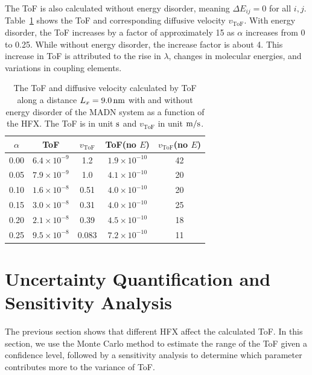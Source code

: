 \documentclass[%
 reprint,
superscriptaddress,
 amsmath,amssymb,
 aps,
prb,
floatfix
]{revtex4-2}
\begin{document}
The ToF is also calculated without energy disorder, meaning $\Delta E_{ij}=0$ for all $i,j$.
Table~\ref{tab:ToF_MADN_HFX} shows the ToF and corresponding diffusive velocity $v_\text{ToF}$.
With energy disorder, the ToF increases by a factor of approximately 15 as $\alpha$ increases from 0 to 0.25.  
While without energy disorder, the increase factor is about 4. This increase in ToF is attributed to the rise in $\lambda$, changes in molecular energies, and variations in coupling elements.

\begin{table}[tbp]
\caption{The ToF and diffusive velocity calculated by ToF along a distance $L_x = \unit[9.0]{nm}$ with and without energy disorder of the MADN system as a function of the HFX. The ToF is in unit $\unit[]{s}$ and $v_\text{ToF}$ in unit $\unit[]{m/s}$.}
\begin{ruledtabular}
  \begin{tabular}{c c c c c}
        $\alpha$ & ToF& $v_\text{ToF}$ & ToF(no $E$)& $v_\text{ToF}$(no $E$) \\
    \hline
        0.00 &  $6.4 \times 10^{-9}$ & 1.2 & $1.9 \times 10^{-10}$ & 42 \\
        0.05 & $ 7.9 \times 10^{-9}$ & 1.0 & $4.1 \times 10^{-10}$ & 20 \\
        0.10 & $ 1.6 \times 10^{-8}$ & 0.51 & $4.0 \times 10^{-10} $ & 20 \\
        0.15 & $ 3.0 \times 10^{-8}$ & 0.31 & $4.0 \times 10^{-10} $ & 25 \\
        0.20 & $ 2.1 \times 10^{-8}$ & 0.39 & $4.5 \times 10^{-10}$ & 18 \\
        0.25 & $ 9.5 \times 10^{-8}$ & 0.083 & $7.2 \times 10^{-10}$ & 11 \\
    \end{tabular}
\end{ruledtabular}
\label{tab:ToF_MADN_HFX}
\end{table}



\section{Uncertainty Quantification and Sensitivity Analysis}
\label{sec:UQ}
The previous section shows that different HFX affect the calculated ToF. In this section, we use the Monte Carlo method to estimate the range of the ToF given a confidence level, followed by a sensitivity analysis to determine which parameter contributes more to the variance of ToF. 
\end{document}
